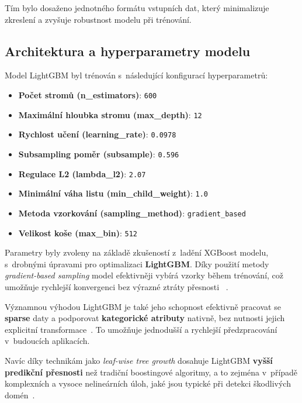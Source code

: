 \noindent Tím bylo dosaženo jednotného formátu vstupních dat, který minimalizuje zkreslení a zvyšuje robustnost modelu při trénování.


\subsection{Architektura a hyperparametry modelu}

Model LightGBM byl trénován s~následující konfigurací hyperparametrů:
\begin{itemize}
    \item \textbf{Počet stromů (n\_estimators)}: \texttt{600}
    \item \textbf{Maximální hloubka stromu (max\_depth)}: \texttt{12}
    \item \textbf{Rychlost učení (learning\_rate)}: \texttt{0.0978}
    \item \textbf{Subsampling poměr (subsample)}: \texttt{0.596}
    \item \textbf{Regulace L2 (lambda\_l2)}: \texttt{2.07}
    \item \textbf{Minimální váha listu (min\_child\_weight)}: \texttt{1.0}
    \item \textbf{Metoda vzorkování (sampling\_method)}: \texttt{gradient\_based}
    \item \textbf{Velikost koše (max\_bin)}: \texttt{512}
\end{itemize}

\noindent Parametry byly zvoleny na základě zkušeností z~ladění XGBoost modelu, s~drobnými úpravami pro optimalizaci \textbf{LightGBM}. Díky použití metody \textit{gradient-based sampling} model efektivněji vybírá vzorky během trénování, což umožňuje rychlejší konvergenci bez výrazné ztráty přesnosti ~\cite{ke2017lightgbm}.

Významnou výhodou LightGBM je také jeho schopnost efektivně pracovat se \textbf{sparse} daty a podporovat \textbf{kategorické atributy} nativně, bez nutnosti jejich explicitní transformace~\cite{ke2017lightgbm}. To umožňuje jednodušší a rychlejší předzpracování v~budoucích aplikacích.

Navíc díky technikám jako \textit{leaf-wise tree growth} dosahuje LightGBM \textbf{vyšší predikční přesnosti} než tradiční boostingové algoritmy, a to zejména v~případě komplexních a vysoce nelineárních úloh, jaké jsou typické při detekci škodlivých domén~\cite{ke2017lightgbm, zhao2020malicious}.







